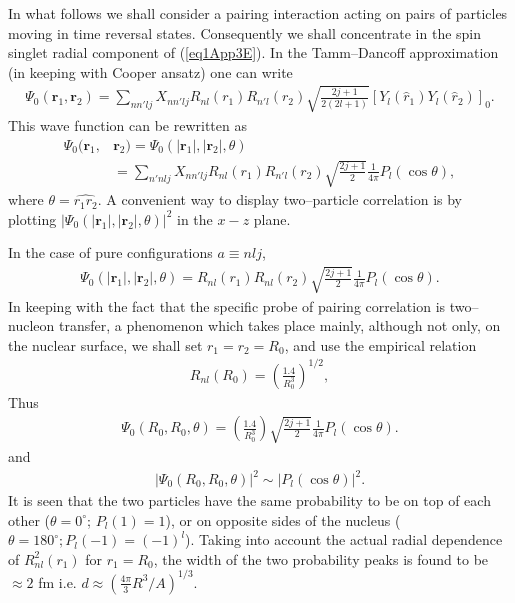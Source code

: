 \begin{subappendices}
In what follows we shall consider a pairing interaction acting on pairs of particles moving in time reversal states. Consequently we shall concentrate in the spin singlet radial component of (\ref{eq1App3E}). In the Tamm--Dancoff approximation (in keeping with Cooper ansatz) one can write
\begin{align}\label{eq2App3E}
\Psi_0(\mathbf r_1,\mathbf r_2)=\sum_{nn'lj}X_{nn'lj}R_{nl}(r_1)R_{n'l}(r_2)\sqrt{\frac{2j+1}{2(2l+1)}}\left[Y_l(\hat r_1)Y_l(\hat r_2)\right]_0.
\end{align}
This wave function can be rewritten as
\begin{align}\label{eq3App3Ex}
\Psi_0(\mathbf r_1,&\mathbf r_2)=\Psi_0(|\mathbf r_1|,|\mathbf r_2|,\theta)\\
&=\sum_{n'nlj}X_{nn'lj}R_{nl}(r_1)R_{n'l}(r_2)\sqrt{\frac{2j+1}{2}}\frac{1}{4\pi}P_l(\cos\theta),
\end{align}
where $\theta=\widehat{r_1r_2}$. A convenient way to display two--particle correlation is by plotting $|\Psi_0(|\mathbf r_1|,|\mathbf r_2|,\theta)|^2$ in the $x-z$ plane.


In the case of pure configurations $a\equiv nlj$,
\begin{align}\label{eq4App3Ex}
\Psi_0(|\mathbf r_1|,|\mathbf r_2|,\theta)
=R_{nl}(r_1)R_{nl}(r_2)\sqrt{\frac{2j+1}{2}}\frac{1}{4\pi}P_l(\cos\theta).
\end{align}
In keeping with the fact that the specific probe of pairing correlation is two--nucleon transfer, a phenomenon which takes place mainly, although not only, on the nuclear surface, we shall set $r_1=r_2=R_0$, and use the empirical relation 
\begin{align}\label{eq5App3Ex}
R_{nl}(R_0)=\left(\frac{1.4}{R_0^3}\right)^{1/2},
\end{align}
Thus 
\begin{align}\label{eq6App3E}
\Psi_0(R_0,R_0,\theta)
=\left(\frac{1.4}{R_0^3}\right)\sqrt{\frac{2j+1}{2}}\frac{1}{4\pi}P_l(\cos\theta).
\end{align}
and 
\begin{align}\label{eq7App3E}
|\Psi_0(R_0,R_0,\theta)|^2\sim |P_l(\cos\theta)|^2.
\end{align}
It is seen that the two particles have the same probability to be on top of each other ($\theta=0^\circ$; $P_l(1)=1$), or on opposite sides of the nucleus ($\theta=180^\circ; P_l(-1)=(-1)^l$). Taking into account the actual radial dependence of $R^2_{nl}(r_1)$ for $r_1=R_0$, the width of the two probability peaks is found to be $\approx 2$ fm i.e. $d\approx\left(\frac{4\pi}{3}R^3/A\right)^{1/3}$.


\end{subappendices}

